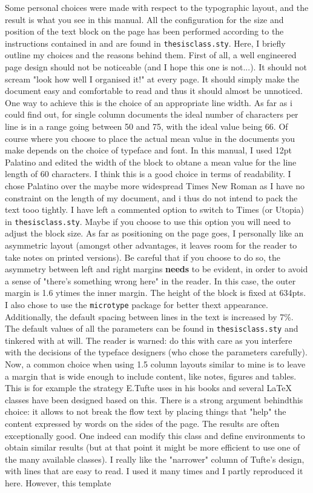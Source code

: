 Some personal choices were made with respect to the typographic layout, and the result is what you see in this manual. All the configuration for the size and position of the text block on the page has been performed according to the instructions contained in \cite{memoirman} and are found in \texttt{thesisclass.sty}. Here, I briefly outline my choices and the reasons behind them. First of all, a well engineered page design should not be noticeable (and I hope this one is not...). It should not scream "look how well I organised it!" at every page. It should simply make the document easy and comfortable to read and thus it should almost be unnoticed. One way to achieve this is the choice of an appropriate line width. As far as i could find out, for single column documents the ideal number of characters per line is in a range going between 50 and 75, with the ideal value being 66. Of course where you choose to place the actual mean value in the documents you make depends on the choice of typeface and font. In this manual, I used 12pt Palatino and edited the width of the block to obtane a mean value for the line length of 60 characters. I think this is a good choice in terms of readability. I chose Palatino over the maybe more widespread Times New Roman as I have no constraint on the length of my document, and i thus do not intend to pack the text tooo tightly. I have left a commented option to switch to Times (or Utopia) in \texttt{thesisclass.sty}. Maybe if you choose to use this option you will need to adjust the block size. As far as positioning on the page goes, I personally like an asymmetric layout (amongst other advantages, it leaves room for the reader to take notes on printed versions). Be careful that if you choose to do so, the asymmetry between left and right margins \textbf{needs} to be evident, in order to avoid a sense of "there's something wrong here" in the reader. In this case, the outer margin is 1.6 ytimes the inner margin. The height of the block is fixed at 634pts. I also chose to use the \texttt{microtype} package for better thext appearance. Additionally, the default spacing between lines in the text is increased by 7\%. The default values of all the parameters can be found in \texttt{thesisclass.sty} and tinkered with at will. The reader is warned: do this with care as you interfere with the decisions of the typeface designers (who chose the parameters carefully). Now, a common choice when using 1.5 column layouts similar to mine is to leave a margin that is wide enough to include content, like notes, figures and tables. This is for example the strategy E.Tufte uses in his books and several \LaTeX\hspace{2pt} classes have been designed based on this. There is a strong argument behindthis choice: it allows to not break the flow text by placing things that "help" the content expressed by words on the sides of the page. The results are often exceptionally good. One indeed can modify this class and define environments to obtain similar results (but at that point it might be more efficient to use one of the many available classes). I really like the "narrower" column of Tufte's design, with lines that are easy to read. I used it many times and I partly reproduced it here. However, this template 